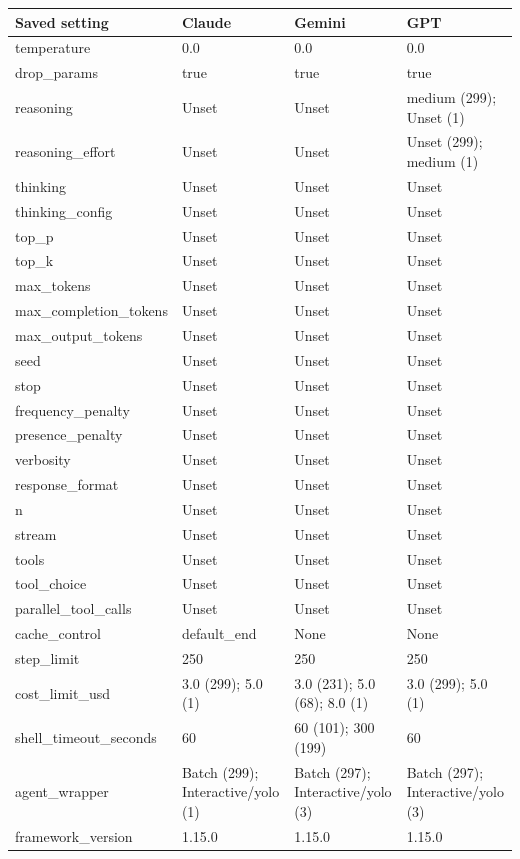 \begin{tabular}{llll}
\hline
Saved setting & Claude & Gemini & GPT \\
\hline
temperature & 0.0 & 0.0 & 0.0 \\
drop\_params & true & true & true \\
reasoning & Unset & Unset & medium (299); Unset (1) \\
reasoning\_effort & Unset & Unset & Unset (299); medium (1) \\
thinking & Unset & Unset & Unset \\
thinking\_config & Unset & Unset & Unset \\
top\_p & Unset & Unset & Unset \\
top\_k & Unset & Unset & Unset \\
max\_tokens & Unset & Unset & Unset \\
max\_completion\_tokens & Unset & Unset & Unset \\
max\_output\_tokens & Unset & Unset & Unset \\
seed & Unset & Unset & Unset \\
stop & Unset & Unset & Unset \\
frequency\_penalty & Unset & Unset & Unset \\
presence\_penalty & Unset & Unset & Unset \\
verbosity & Unset & Unset & Unset \\
response\_format & Unset & Unset & Unset \\
n & Unset & Unset & Unset \\
stream & Unset & Unset & Unset \\
tools & Unset & Unset & Unset \\
tool\_choice & Unset & Unset & Unset \\
parallel\_tool\_calls & Unset & Unset & Unset \\
cache\_control & default\_end & None & None \\
step\_limit & 250 & 250 & 250 \\
cost\_limit\_usd & 3.0 (299); 5.0 (1) & 3.0 (231); 5.0 (68); 8.0 (1) & 3.0 (299); 5.0 (1) \\
shell\_timeout\_seconds & 60 & 60 (101); 300 (199) & 60 \\
agent\_wrapper & Batch (299); Interactive/yolo (1) & Batch (297); Interactive/yolo (3) & Batch (297); Interactive/yolo (3) \\
framework\_version & 1.15.0 & 1.15.0 & 1.15.0 \\
\hline
\end{tabular}
